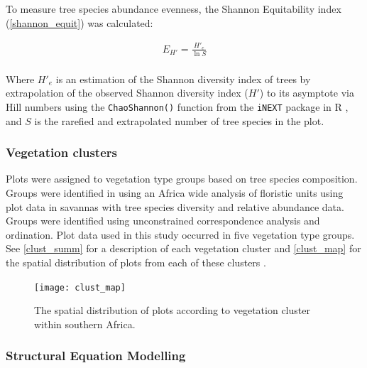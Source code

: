 \documentclass[11pt,a4paper]{article}
\begin{document}
To measure tree species abundance evenness, the Shannon Equitability index \citep{} (\autoref{shannon_equit}) was calculated: 

\begin{equation}
	\begin{gathered}
		E_{H'} = \frac{H'_{e}}{\ln{S}} \\
	\end{gathered}
	\label{shannon_equit}
\end{equation}

Where $H'_{e}$ is an estimation of the Shannon diversity index of trees by extrapolation of the observed Shannon diversity index ($H'$) to its asymptote via Hill numbers using the \verb|ChaoShannon()| function from the \verb|iNEXT| package in R \citep{Hsieh2016}, and $S$ is the rarefied and extrapolated number of tree species in the plot.

\subsubsection{Vegetation clusters}

Plots were assigned to vegetation type groups based on tree species composition. Groups were identified in \citet{Fayolle2018} using an Africa wide analysis of floristic units using plot data in savannas with tree species diversity and relative abundance data. Groups were identified using unconstrained correspondence analysis and ordination. Plot data used in this study occurred in five vegetation type groups. See \autoref{clust_summ} for a description of each vegetation cluster and \autoref{clust_map} for the spatial distribution of plots from each of these clusters .



\begin{figure}[H]
\centering
	\texttt{[image: clust\_map]}
	\caption{The spatial distribution of plots according to vegetation cluster within southern Africa.}
	\label{clust_map}
\end{figure}

\subsubsection{Structural Equation Modelling}
\end{document}

